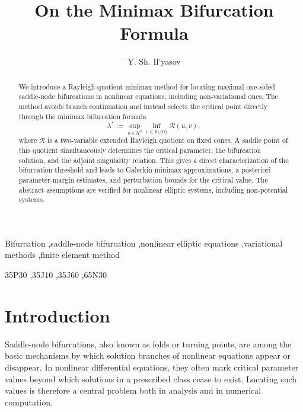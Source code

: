 \documentclass[preprint,10pt]{elsarticle}
\numberwithin{equation}{section}
\begin{document}
	
	\begin{frontmatter}
		
		\title{On the Minimax Bifurcation Formula}
		
		\author[inst1]{Y. Sh. Il'yasov}
		
		\address[inst1]{Institute of Mathematics, Ufa Federal Research Centre, RAS,
			Chernyshevsky str. 112, 450008 Ufa, Russia}
		
		
	\begin{abstract}
		We introduce a Rayleigh-quotient minimax method for locating maximal
		one-sided saddle-node bifurcations in nonlinear equations, including
		non-variational ones. The method avoids branch continuation and instead
		selects the critical point directly through the minimax bifurcation formula
		\[
		\lambda^*
		:=
		\sup_{u\in\mathcal U^o}
		\inf_{v\in\mathcal S\setminus\{0\}}
		\mathcal R(u,v),
		\]
		where \(\mathcal R\) is a two-variable extended Rayleigh quotient on fixed
		cones. A saddle point of this quotient simultaneously determines the
		critical parameter, the bifurcation solution, and the adjoint singularity
		relation. This gives a direct characterization of the bifurcation threshold
		and leads to Galerkin minimax approximations, a posteriori parameter-margin
		estimates, and perturbation bounds for the critical value. The abstract
		assumptions are verified for nonlinear elliptic systems, including
		non-potential systems.
	\end{abstract}
	
		\begin{keyword}
			Bifurcation \sep saddle-node bifurcation \sep nonlinear elliptic equations
			\sep variational methods \sep finite element method
			
			\MSC[2020] 35P30 \sep 35J10 \sep 35J60 \sep 65N30
		\end{keyword}
		
	\end{frontmatter}






\section{Introduction}
\label{sec.Intr}

Saddle-node bifurcations, also known as folds or turning points, are among the
basic mechanisms by which solution branches of nonlinear equations appear or
disappear. In nonlinear differential equations, they often mark critical
parameter values beyond which solutions in a prescribed class cease to exist.
Locating such values is therefore a central problem both in analysis and in
numerical computation.
\end{document}
